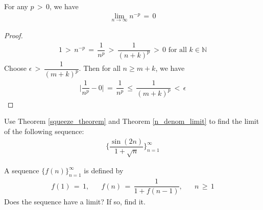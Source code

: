 \begin{theorem}
For any $p \hspace{2pt} > \hspace{2pt} 0$, we have
\begin{align*}
    \lim_{n \longrightarrow \infty} n^{-p} \hspace{2pt} = \hspace{2pt} 0
\end{align*}
\begin{proof}
\begin{align*}
    1 \hspace{2pt} > \hspace{2pt} n^{-p} \hspace{2pt} = \hspace{2pt} \dfrac{1}{n^{p}} \hspace{2pt} > \hspace{2pt} \dfrac{1}{(n+k)^{p}} \hspace{2pt} > \hspace{2pt} 0 \hspace{4pt} \text{for all} \hspace{4pt} k \in \mathbb{N}
\end{align*}
Choose $\epsilon \hspace{2pt} > \hspace{2pt} \dfrac{1}{(m+k)^p}$. Then for all $n \geq m+k$, we have
\begin{align*}
    \Big\lvert \dfrac{1}{n^{p}} - 0 \Big\rvert \hspace{2pt} = \hspace{2pt} \dfrac{1}{n^{p}} \hspace{2pt} \leq \hspace{2pt} \dfrac{1}{(m + k)^{p}} \hspace{2pt} < \hspace{2pt} \epsilon
\end{align*}
\end{proof}
\label{n_denom_limit}
\end{theorem}

\begin{exercise}
Use Theorem \ref{squeeze_theorem} and Theorem \ref{n_denom_limit} to find the limit of the following sequence:
\begin{align*}
    \Big\{\dfrac{\sin(2n)}{1+\sqrt{n}}\Big\}_{n=1}^{\infty}
\end{align*}
\end{exercise}

\begin{exercise}
A sequence $\{f(n)\}_{n=1}^{\infty}$ is defined by 
\begin{align*}
    f(1) \hspace{2pt} = \hspace{2pt} 1, \hspace{20pt} f(n) \hspace{2pt} = \hspace{2pt} \dfrac{1}{1+f(n-1)}, \hspace{20pt} n \hspace{2pt} \geq \hspace{2pt} 1
\end{align*}
Does the sequence have a limit? If so, find it.
\end{exercise}

